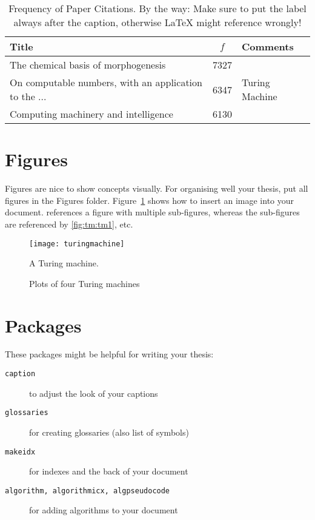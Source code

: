 \begin{table}[ht!]
\centering
\caption{Frequency of Paper Citations. By the way: Make sure to put the label always after the caption, otherwise \LaTeX{} might reference wrongly!}
\begin{tabular}{lcl} \toprule
Title&$f$&Comments\\ \midrule
The chemical basis of morphogenesis & 7327 & \\ 
On computable numbers, with an application to the ... & 6347 & Turing Machine\\
Computing machinery and intelligence & 6130 & \\ \bottomrule
\end{tabular}
\label{tab:table}
\end{table}




\section{Figures}
Figures are nice to show concepts visually. For organising well your thesis, put all figures in the Figures folder. Figure~\ref{fig:machine} shows how to insert an image into your document.  references a figure with multiple sub-figures, whereas the sub-figures are referenced by \cref{fig:tm:tm1}, etc. 

\begin{figure}
\centering
\texttt{[image: turingmachine]}
\caption{A Turing machine.}
\label{fig:machine}
\end{figure}


\begin{figure}
\centering
{}
\caption{Plots of four Turing machines}
\label{fig:tm}
\end{figure}




\section{Packages}
These packages might be helpful for writing your thesis:

\begin{description}
	\item[\texttt{caption}] to adjust the look of your captions
	\item[\texttt{glossaries}] for creating glossaries (also list of symbols)
	\item[\texttt{makeidx}] for indexes and the back of your document
	\item[\texttt{algorithm, algorithmicx, algpseudocode}] for adding algorithms to your document
\end{description}